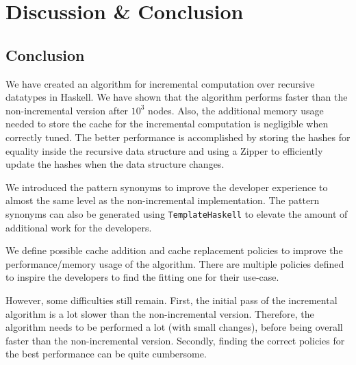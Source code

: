 \chapter{Discussion \& Conclusion}





\section{Conclusion}

We have created an algorithm for incremental computation over recursive datatypes in Haskell. We have shown that the algorithm performs faster than the non-incremental version after $10^3$ nodes. Also, the additional memory usage needed to store the cache for the incremental computation is negligible when correctly tuned. The better performance is accomplished by storing the hashes for equality inside the recursive data structure and using a Zipper to efficiently update the hashes when the data structure changes.

We introduced the pattern synonyms to improve the developer experience to almost the same level as the non-incremental implementation. The pattern synonyms can also be generated using \texttt{TemplateHaskell} to elevate the amount of additional work for the developers.

We define possible cache addition and cache replacement policies to improve the performance/memory usage of the algorithm. There are multiple policies defined to inspire the developers to find the fitting one for their use-case.

However, some difficulties still remain. First, the initial pass of the incremental algorithm is a lot slower than the non-incremental version. Therefore, the algorithm needs to be performed a lot (with small changes), before being overall faster than the non-incremental version. Secondly, finding the correct policies for the best performance can be quite cumbersome. 
